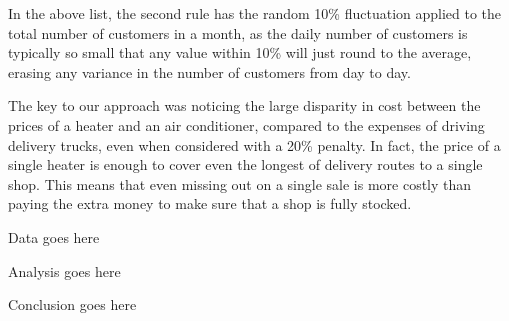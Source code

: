\begin{paper}
In the above list, the second rule has the random 10\% fluctuation applied to
the total number of customers in a month, as the daily number of customers is
typically so small that any value within 10\% will just round to the average,
erasing any variance in the number of customers from day to day.


The key to our approach was noticing the large disparity in cost between the
prices of a heater and an air conditioner, compared to the expenses of driving
delivery trucks, even when considered with a 20\% penalty.
In fact, the price of a single heater is enough to cover even the longest of
delivery routes to a single shop.
This means that even missing out on a single sale is more costly than paying the
extra money to make sure that a shop is fully stocked.


Data goes here


Analysis goes here


Conclusion goes here

\end{paper}

